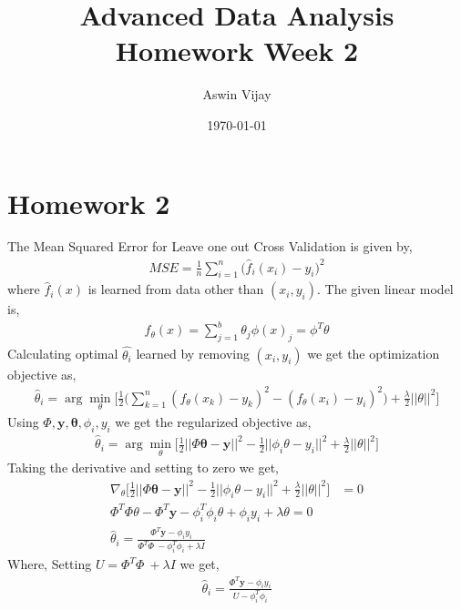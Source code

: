 \documentclass{article}
\title{Advanced Data Analysis\\Homework Week 2}
\author{Aswin Vijay}
\date\today
\begin{document}
\maketitle %

\section*{Homework 2}

The Mean Squared Error for Leave one out Cross Validation is given by,
\begin{align*}
    MSE = \frac{1}{n}\sum_{i=1}^{n}\biggl(\hat{f}_i(x_i)-y_i\biggr)^2
\end{align*}
where $\hat{f}_i(x)$ is learned from data other than $(x_i,y_i)$.
The given linear model is,
\begin{align*}
    f_\theta(x) = \sum_{j=1}^{b}\theta_j\phi(x)_j = \phi^T\theta
\end{align*}
Calculating optimal $\hat{\theta_i}$ learned by removing $(x_i,y_i)$ we get the optimization objective as,
\begin{align*}
    \hat{\theta}_i = \arg\min_\theta\biggl[\frac{1}{2}\biggl(\sum_{k=1}^{n}(f_\theta(x_k)-y_k)^2 - (f_\theta(x_i)-y_i)^2\biggr) + \frac{\lambda}{2}||\theta||^2\biggr]
\end{align*}
Using $\Phi,\mathbf{y},\mathbf{\theta},\phi_i,y_i$ we get the regularized objective as,
\begin{align*}
    \hat{\theta}_i = \arg\min_\theta\biggl[\frac{1}{2}||\Phi\mathbf{\theta}-\mathbf{y}||^2 - \frac{1}{2}||\phi_i\theta-y_i||^2 + \frac{\lambda}{2}||\theta||^2\biggr]
\end{align*}
Taking the derivative and setting to zero we get,
\begin{align*}
    \nabla_\theta\biggl[\frac{1}{2}||\Phi\mathbf{\theta}-\mathbf{y}||^2 - \frac{1}{2}||\phi_i\theta-y_i||^2 + \frac{\lambda}{2}||\theta||^2\biggr] &= 0\\
    \Phi^T\Phi\theta-\Phi^T\mathbf{y} - \phi_i^T\phi_i\theta + \phi_iy_i+\lambda\theta = 0\\
    \hat{\theta}_i = \frac{\Phi^T\mathbf{y} - \phi_iy_i}{\Phi^T\Phi\ - \phi_i^T\phi_i +\lambda I }
\end{align*}
Where, Setting $U = \Phi^T\Phi\ +\lambda I$ we get,
\begin{align*}
    \hat{\theta}_i = \frac{\Phi^T\mathbf{y} - \phi_iy_i}{U - \phi_i^T\phi_i }
\end{align*}
\end{document}
